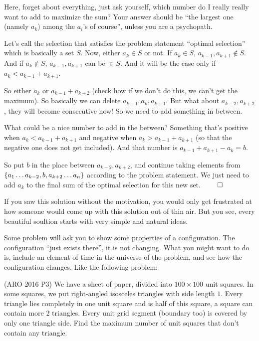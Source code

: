 \documentclass[12pt,a4paper]{article}
\begin{document}
		\begin{solution}
			Here, forget about everything, just ask yourself, which number do I really really want to add to maximize the sum? Your answer should be ``the largest one (namely $ a_k $) among the $ a_i $'s of course'', unless you are a psychopath. 
			
			Let's call the selection that satisfies the problem statement ``optimal selection'' which is basically a set $ S $. Now, either $ a_k \in S $ or not. If $ a_k\in S $, $ a_{k-1}, a_{k+1} \not\in S $. And if $ a_k\not\in S $, $ a_{k-1}, a_{k+1} $ can be $ \in S $. And it will be the case only if $ a_k< a_{k-1} + a_{k+1} $.
			
			So either $ a_k $ or $ a_{k-1}+a_{k+2} $ (check how if we don't do this, we can't get the maximum). So basically we can delete $ a_{k-1}, a_{k}, a_{k+1} $. But what about $ a_{k-2}, a_{k+2} $, they will become consecutive now! So we need to add something in between. 
			
			What could be a nice number to add in the between? Something that's positive when $ a_k< a_{k-1} + a_{k+1} $ and negative when $ a_k> a_{k-1} + a_{k+1} $ (so that the negative one does not get included). And that number is $ a_{k-1}+a_{k+1}-a_k = b $.
			
			So put $ b $ in the place between $ a_{k-2}, a_{k+2} $, and continue taking elements from $ \{a_1\dots \\ a_{k-2}, b, a_{k+2} \dots a_n\} $ according to the problem statement. We just need to add $ a_k $ to the final sum of the optimal selection for this new set. \hfill$ \qed $
		\end{solution}
		
		If you saw this solution without the motivation, you would only get frustrated at how someone would come up with this solution out of thin air. But you see, every beautiful soultion starts with very simple and natural ideas.
		
		
		Some problem will ask you to show some properties of a configuration. The configuration  ``just exists there'', it is not changing. What you might want to do is, include an element of time in the universe of the problem, and see how the configuration changes. Like the following problem:
		
		\begin{example}(ARO 2016 P3)
			We have a sheet of paper, divided into $ 100\times 100 $ unit squares. In some squares, we put right-angled isosceles triangles with side length $ 1 $. Every triangle lies completely in one unit square and is half of this square, a square can contain more $ 2 $ triangles. Every unit grid segment (boundary too) is covered by only one triangle side. Find the maximum number of unit squares that don't contain any triangle.
		\end{example}
		
\end{document}
